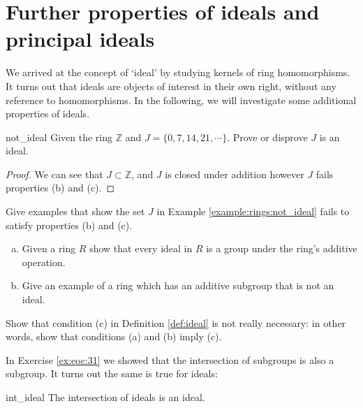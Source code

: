 \section{Further properties of ideals and principal ideals}
\label{sec:Rings:FurtherProperties}

We arrived at the concept of `ideal' by studying kernels of ring homomorphisms. It turns out that ideals are objects of interest in their own right, without any reference to homomorphisms. In the following, we will investigate some additional properties of ideals.

\begin{example}{not_ideal}
Given the ring ${\mathbb Z}$ and $J=\{0,7,14,21,\cdots\}$.  Prove or disprove $J$ is an ideal.
\end{example}

\begin{proof}
We can see that $J\subset {\mathbb Z}$, and $J$ is closed under addition however $J$ fails properties (b) and (c).
\end{proof}

\begin{exercise}{}
Give examples that show the set $J$ in Example \ref{example:rings:not_ideal} fails to satisfy properties (b) and (c).
\end{exercise}

\begin{exercise}{}
\begin{enumerate}[(a)]
\item Given a ring $R$ show that every ideal in $R$ is a group under the ring's additive operation.
\item Give an example of a ring which has an additive subgroup that is not an ideal.
\end{enumerate}
\end{exercise}

\begin{exercise}{}
Show that condition (c) in Definition \ref{def:ideal} is not really necessary:  in other words, show that conditions (a) and (b) imply (c).
\end{exercise}


In Exercise \ref{ex:eoc:31} we showed that the intersection of subgroups is also a subgroup.  It turns out the same is true for ideals:

\begin{prop}{int_ideal} 
The intersection of ideals is an ideal.
\end{prop}

